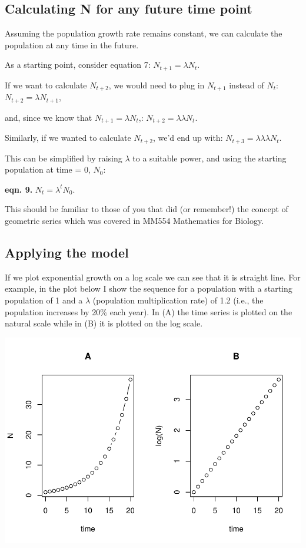 \documentclass[
  a4paper]{book}
\begin{document}
\subsection{Calculating N for any future time point}\label{calculating-n-for-any-future-time-point}

Assuming the population growth rate remains constant, we can calculate the population at any time in the future.

As a starting point, consider equation 7: \(N_{t+1} = \lambda N_t\).

If we want to calculate \(N_{t+2}\), we would need to plug in \(N_{t+1}\) instead of \(N_t\): \(N_{t+2} = \lambda N_{t+1}\),

and, since we know that \(N_{t+1} = \lambda N_t\),: \(N_{t+2} = \lambda   \lambda N_t\).

Similarly, if we wanted to calculate \(N_{t+2}\), we'd end up with: \(N_{t+3} = \lambda \lambda \lambda N_t\).

This can be simplified by raising \(\lambda\) to a suitable power, and using the starting population at time = 0, \(N_0\):

\textbf{eqn. 9.} \(N_{t} = \lambda ^tN_0\).

This should be familiar to those of you that did (or remember!) the concept of geometric series which was covered in MM554 Mathematics for Biology.

\subsection{Applying the model}\label{applying-the-model}

If we plot exponential growth on a log scale we can see that it is straight line. For example, in the plot below I show the sequence for a population with a starting population of 1 and a \(\lambda\) (population multiplication rate) of 1.2 (i.e., the population increases by 20\% each year). In (A) the time series is plotted on the natural scale while in (B) it is plotted on the log scale.

\includegraphics{BB512_files/figure-latex/unnamed-chunk-74-1.pdf}
\end{document}

